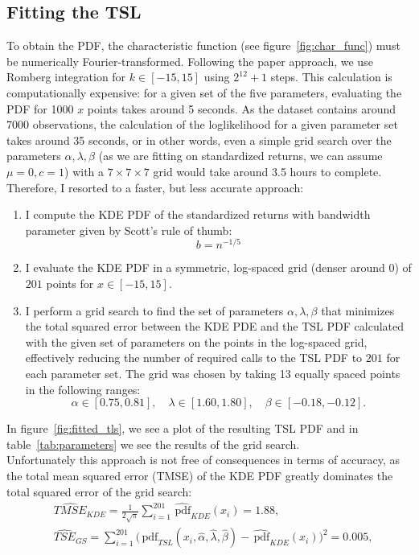 \documentclass[11pt]{article}
\newcommand{\pdf}{\,\text{pdf}}
\begin{document}
        \subsection{Fitting the TSL}
        To obtain the PDF, the characteristic function (see figure~\ref{fig:char_func}) must be numerically Fourier-transformed.
        Following the paper approach, we use Romberg integration for $k \in [-15, 15]$ using $2^{12}+1$ steps.
        This calculation is computationally expensive: for a given set of the five parameters, evaluating the PDF for 1000 $x$ points takes around 5 seconds.
        As the dataset contains around 7000 observations, the calculation of the loglikelihood for a given parameter set takes around 35 seconds, or in other words,
        even a simple grid search over the parameters $\alpha, \lambda, \beta$ (as we are fitting on standardized returns, we can assume $\mu=0, c=1$) with a $7\times 7\times 7$ grid would take around 3.5 hours to complete.
        Therefore, I resorted to a faster, but less accurate approach:
        \begin{enumerate}
            \item I compute the KDE PDF of the standardized returns with bandwidth parameter given by Scott’s rule of thumb:
                    $$b = n^{-1/5}$$
            \item I evaluate the KDE PDF in a symmetric, log-spaced grid (denser around $0$) of $201$ points for $x\in [-15,15]$.
            \item I perform a grid search to find the set of parameters $\alpha, \lambda, \beta$ that minimizes the total squared error
                between the KDE PDE and the TSL PDF calculated with the given set of parameters on the points in the log-spaced grid,
                effectively reducing the number of required calls to the TSL PDF to $201$ for each parameter set.
                The grid was chosen by taking 13 equally spaced points in the following ranges:
                $$ \alpha \in [0.75,0.81], \quad \lambda \in [1.60,1.80], \quad \beta \in [-0.18,-0.12].$$
        \end{enumerate}
        In figure~\ref{fig:fitted_tls}, we see a plot of the resulting TSL PDF and in table~\ref{tab:parameters} we see the results of the grid search.\\
        Unfortunately this approach is not free of consequences in terms of accuracy, as the total mean squared error (TMSE) of the KDE PDF greatly dominates the total squared error of the grid search:
        \begin{equation}
            \begin{aligned}
                &\widehat{TMSE}_{KDE} = \frac{1}{2\sqrt{\pi}} \sum_{i=1}^{201}\widehat{\pdf}_{KDE}(x_i) = 1.88, \\
                &\widehat{TSE}_{GS} = \sum_{i=1}^{201}\bigg(\pdf_{TSL}(x_i, \hat{\alpha}, \hat{\lambda}, \hat{\beta})-\widehat{\pdf}_{KDE}(x_i)\bigg)^2 = 0.005,
            \end{aligned}
        \end{equation}
\end{document}
